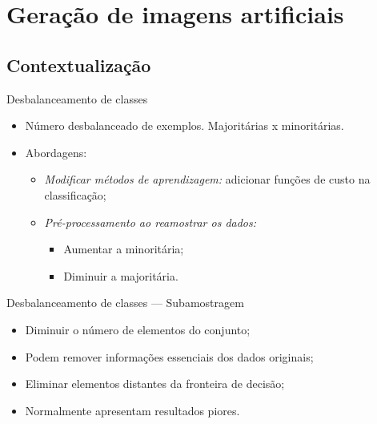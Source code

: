 \documentclass{beamer}
\begin{document}
\section{Geração de imagens artificiais}
\subsection{Contextualização}
\begin{frame}{Desbalanceamento de classes}
  \setlength\leftmargini{1em}
  \justifying
  \begin{itemize}
    \item Número desbalanceado de exemplos. Majoritárias x minoritárias.
    \item Abordagens:
    \begin{itemize}
      \item \emph{Modificar métodos de aprendizagem:} adicionar funções de custo na classificação;
      \item \emph{Pré-processamento ao reamostrar os dados:}
      \begin{itemize}
        \item Aumentar a minoritária;
        \item Diminuir a majoritária.
      \end{itemize}
    \end{itemize}
  \end{itemize}
\end{frame}
\begin{frame}{Desbalanceamento de classes --- Subamostragem}
  \setlength\leftmargini{1em}
  \justifying
  \begin{itemize}
    \item Diminuir o número de elementos do conjunto;
    \item Podem remover informações essenciais dos dados originais;
    \item Eliminar elementos distantes da fronteira de decisão;
    \item Normalmente apresentam resultados piores.
  \end{itemize}
\end{frame}
\end{document}
